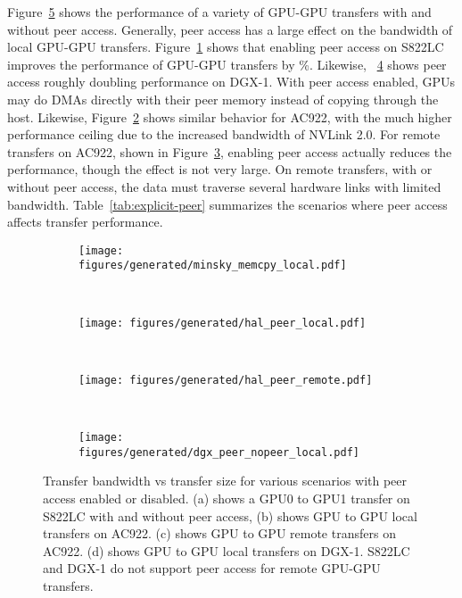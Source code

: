 Figure~\ref{fig:explicit-peer} shows the performance of a variety of GPU-GPU transfers with and without peer access.
Generally, peer access has a large effect on the bandwidth of local GPU-GPU transfers.
Figure~\ref{fig:explicit-s822lc-peer} shows that enabling peer access on S822LC improves the performance of GPU-GPU transfers by \%.
Likewise, ~\ref{fig:explicit-dgx-peer-nopeer-local} shows peer access roughly doubling performance on DGX-1.
With peer access enabled, GPUs may do DMAs directly with their peer memory instead of copying through the host.
Likewise, Figure~\ref{fig:explicit-hal-peer-local} shows similar behavior for AC922, with the much higher performance ceiling due to the increased bandwidth of NVLink 2.0.
For remote transfers on AC922, shown in Figure~\ref{fig:explicit-hal-peer-remote}, enabling peer access actually reduces the performance, though the effect is not very large.
On remote transfers, with or without peer access, the data must traverse several hardware links with limited bandwidth.
Table~\ref{tab:explicit-peer} summarizes the scenarios where peer access affects transfer performance.

\begin{figure}[ht]
	\centering
	\begin{subfigure}[b]{0.3\textwidth}
		\texttt{[image: figures/generated/minsky\_memcpy\_local.pdf]}
		\caption{}
		\label{fig:explicit-s822lc-peer}
	\end{subfigure}
	~
	\begin{subfigure}[b]{0.3\textwidth}
		\texttt{[image: figures/generated/hal\_peer\_local.pdf]}
		\caption{}
		\label{fig:explicit-hal-peer-local}
	\end{subfigure}
	~
	\begin{subfigure}[b]{0.3\textwidth}
		\texttt{[image: figures/generated/hal\_peer\_remote.pdf]}
		\caption{}
		\label{fig:explicit-hal-peer-remote}
	\end{subfigure}
	\\
	\begin{subfigure}[b]{0.3\textwidth}
		\texttt{[image: figures/generated/dgx\_peer\_nopeer\_local.pdf]}
		\caption{}
		\label{fig:explicit-dgx-peer-nopeer-local}
	\end{subfigure}
	
	\caption[]{
		Transfer bandwidth vs transfer size for various scenarios with peer access enabled or disabled.
		(a) shows a GPU0 to GPU1 transfer on S822LC with and without peer access,
		(b) shows GPU to GPU local transfers on AC922.
		(c) shows GPU to GPU remote transfers on AC922.
		(d) shows GPU to GPU local transfers on DGX-1.
		S822LC and DGX-1 do not support peer access for remote GPU-GPU transfers.
	}
	\label{fig:explicit-peer}
\end{figure}


